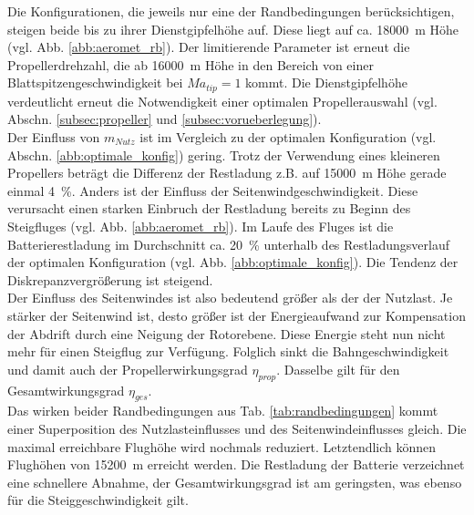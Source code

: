 Die Konfigurationen, die jeweils nur eine der Randbedingungen berücksichtigen, steigen beide bis zu ihrer Dienstgipfelhöhe auf. Diese liegt auf ca. \SI{18000}{m} Höhe (vgl. Abb. \ref{abb:aeromet_rb}). Der limitierende Parameter ist erneut die Propellerdrehzahl, die ab \SI{16000}{m} Höhe in den Bereich von einer Blattspitzengeschwindigkeit bei \ensuremath{Ma_{tip} = 1} kommt. Die Dienstgipfelhöhe verdeutlicht erneut die Notwendigkeit einer optimalen Propellerauswahl (vgl. Abschn. \ref{subsec:propeller} und \ref{subsec:vorueberlegung}). \\
Der Einfluss von \ensuremath{m_{Nutz}} ist im Vergleich zu der optimalen Konfiguration (vgl. Abschn. \ref{abb:optimale_konfig}) gering. Trotz der Verwendung eines kleineren Propellers beträgt die Differenz der Restladung z.B. auf \SI{15000}{m} Höhe gerade einmal \SI{4}{\%}. Anders ist der Einfluss der Seitenwindgeschwindigkeit. Diese verursacht einen starken Einbruch der Restladung bereits zu Beginn des Steigfluges (vgl. Abb. \ref{abb:aeromet_rb}). Im Laufe des Fluges ist die Batterierestladung im Durchschnitt ca. \SI{20}{\%} unterhalb des Restladungsverlauf der optimalen Konfiguration (vgl. Abb. \ref{abb:optimale_konfig}). Die Tendenz der Diskrepanzvergrößerung ist steigend.\\
Der Einfluss des Seitenwindes ist also bedeutend größer als der der Nutzlast. Je stärker der Seitenwind ist, desto größer ist der Energieaufwand zur Kompensation der Abdrift durch eine Neigung der Rotorebene. Diese Energie steht nun nicht mehr für einen Steigflug zur Verfügung. Folglich sinkt die Bahngeschwindigkeit und damit auch der Propellerwirkungsgrad \ensuremath{\eta_{prop}}. Dasselbe gilt für den Gesamtwirkungsgrad \ensuremath{\eta_{ges}}. \\
Das wirken beider Randbedingungen aus Tab. \ref{tab:randbedingungen} kommt einer Superposition des Nutzlasteinflusses und des Seitenwindeinflusses gleich. Die maximal erreichbare Flughöhe wird nochmals reduziert. Letztendlich können Flughöhen von \SI{15200}{m} erreicht werden. Die Restladung der Batterie verzeichnet eine schnellere Abnahme, der Gesamtwirkungsgrad ist am geringsten, was ebenso für die Steiggeschwindigkeit gilt. 

